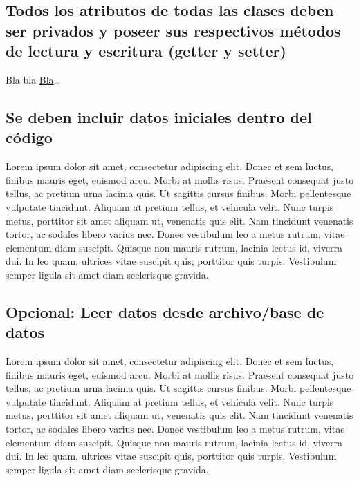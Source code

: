 \subsection{Todos los atributos de todas las clases deben ser privados y poseer sus respectivos métodos de lectura y escritura (getter y setter)}

Bla bla \hyperref[subsec:blablabla]{Bla}\dots

\subsection{Se deben incluir datos iniciales dentro del código}

Lorem ipsum dolor sit amet, consectetur adipiscing elit. Donec et sem luctus, finibus mauris eget, euismod arcu. Morbi at mollis risus. Praesent consequat justo tellus, ac pretium urna lacinia quis. Ut sagittis cursus finibus. Morbi pellentesque vulputate tincidunt. Aliquam at pretium tellus, et vehicula velit. Nunc turpis metus, porttitor sit amet aliquam ut, venenatis quis elit. Nam tincidunt venenatis tortor, ac sodales libero varius nec. Donec vestibulum leo a metus rutrum, vitae elementum diam suscipit. Quisque non mauris rutrum, lacinia lectus id, viverra dui. In leo quam, ultrices vitae suscipit quis, porttitor quis turpis. Vestibulum semper ligula sit amet diam scelerisque gravida.

\subsection*{Opcional: Leer datos desde archivo/base de datos}

Lorem ipsum dolor sit amet, consectetur adipiscing elit. Donec et sem luctus, finibus mauris eget, euismod arcu. Morbi at mollis risus. Praesent consequat justo tellus, ac pretium urna lacinia quis. Ut sagittis cursus finibus. Morbi pellentesque vulputate tincidunt. Aliquam at pretium tellus, et vehicula velit. Nunc turpis metus, porttitor sit amet aliquam ut, venenatis quis elit. Nam tincidunt venenatis tortor, ac sodales libero varius nec. Donec vestibulum leo a metus rutrum, vitae elementum diam suscipit. Quisque non mauris rutrum, lacinia lectus id, viverra dui. In leo quam, ultrices vitae suscipit quis, porttitor quis turpis. Vestibulum semper ligula sit amet diam scelerisque gravida.
